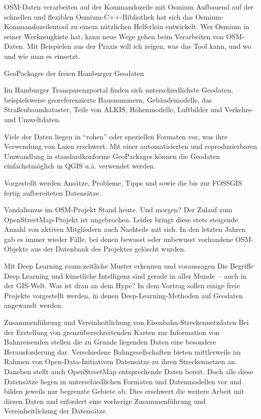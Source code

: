 %
{OSM-Daten verarbeiten auf der \mbox{Kommandozeile} mit Osmium}%
{}%
{Aufbauend auf der schnellen und flexiblen Osmium-C++-Bibliothek hat sich das
Osmium-Kommandozeilentool zu einem nützlichen Helferlein entwickelt. Wer Osmium in seiner
Werkzeugkiste hat, kann neue Wege gehen beim Verarbeiten von OSM-Daten. Mit Beispielen aus der
Praxis will ich zeigen, was das Tool kann, und wo und wie man es einsetzt.}

%
{GeoPackages der freien Hamburger Geodaten}%
{}%
{Im Hamburger Transparenzportal finden sich unterschiedlichste Geodaten, beispielsweise georeferenzierte
  Hausnummern, Gebäudemodelle, das Straßenbaumkataster, Teile von ALKIS, Höhenmodelle, Luftbilder und
  Verkehrs- und Umweltdaten.

Viele der Daten liegen in "`rohen"' oder speziellen Formaten vor, was ihre Verwendung von Laien
erschwert. Mit einer automatisierten und reproduzierbaren Umwandlung in standardkonforme GeoPackages
können die Geodaten einfachstmöglich in QGIS u.ä. verwendet werden.

Vorgestellt werden Ansätze, Probleme, Tipps und sowie die bis zur FOSSGIS fertig aufbereiteten
Datensätze.}

%
{Vandalismus im OSM-Projekt}%
{Stand heute. Und morgen?}%
{
Der Zulauf zum OpenStreetMap-Projekt ist ungebrochen. Leider bringt diese stets
steigende Anzahl von aktiven Mitgliedern auch Nachteile mit sich. In den
letzten Jahren gab es immer wieder Fälle, bei denen bewusst oder unbewusst
vorhandene OSM-Objekte aus der Datenbank des Projektes gelöscht wurden.}

%
{Mit Deep Learning raum-zeitliche Muster erkennen und voraussagen}%
{}%
{Die Begriffe Deep Learning und künstliche Intelligenz sind gerade in aller Munde~--
auch in der GIS-Welt. Was ist dran an dem Hype? In dem Vortrag sollen einige
freie Projekte vorgestellt werden, in denen Deep-Learning-Methoden auf Geodaten
angewandt werden.}

%
{Zusammenführung und Vereinheitlichung von Eisenbahn-Streckennetzdaten}%
{}%
{Bei der Erstellung von grenzüberschreitenden Karten zur Information von Bahnreisenden stellen die
zu Grunde liegenden Daten eine besondere Herausforderung dar. Verschiedene Bahngesellschaften bieten
mittlerweile im Rahmen von Open-Data-Initiativen Datensätze zu ihren Streckennetzen an. Daneben
stellt auch OpenStreetMap entsprechende Daten bereit. Doch alle diese Datensätze liegen in
unterschiedlichen Formaten und Datenmodellen vor und bilden jeweils nur begrenzte Gebiete ab. Dies
erschwert die weitere Arbeit mit diesen Daten und erfordert eine vorherige Zusammenführung und
Vereinheitlichung der Datensätze.}

